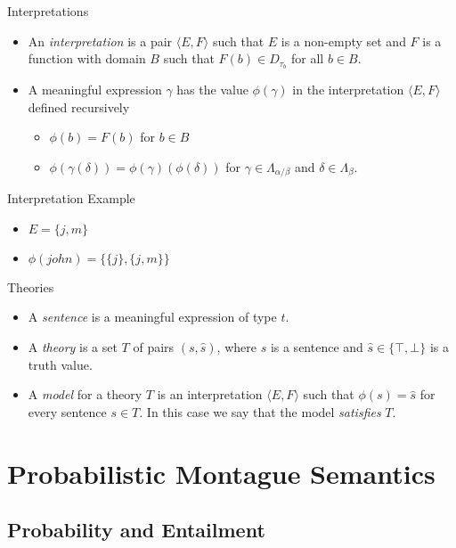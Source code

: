 \documentclass{beamer}
\newlength{\wideitemsep}
\let\olditem\item
\renewcommand{\item}{\setlength{\itemsep}{\wideitemsep}\olditem}
\begin{document}
\begin{frame}{Interpretations}
  \begin{itemize}
  \item An \emph{interpretation} is a pair $\langle E,
    F\rangle$ such that $E$ is a non-empty set and $F$ is a function with
    domain $B$ such that $F(b) \in D_{\tau_b}$ for all $b\in B$.
  \item A meaningful expression $\gamma$ has the value $\phi(\gamma)$ in the
    interpretation $\langle E, F\rangle$ defined recursively
    \begin{itemize}
    \item $\phi(b) = F(b)$ for $b\in B$
    \item $\phi(\gamma(\delta)) = \phi(\gamma)(\phi(\delta))$ for $\gamma
      \in \Lambda_{\alpha/\beta}$ and $\delta \in \Lambda_\beta$.
    \end{itemize}
  \end{itemize}
\end{frame}

\begin{frame}{Interpretation Example}
\begin{itemize}
\item $E = \{j, m\}$
\item $\phi(\mathit{john}) = \{\{j\},\{j,m\}\}$
\end{itemize}
\end{frame}

\begin{frame}{Theories}
  \begin{itemize}
  \item A \emph{sentence} is a meaningful expression of type $t$.
  \item A \emph{theory} is a set $T$ of pairs $(s,\hat{s})$, where $s$
    is a sentence and $\hat{s}\in\{\top,\bot\}$ is a truth value.
  \item A \emph{model} for a theory $T$ is an interpretation $\langle
    E, F\rangle$ such that $\phi(s) = \hat{s}$ for every sentence
    $s\in T$. In this case we say that the model \emph{satisfies} $T$.
  \end{itemize}
\end{frame}

\section{Probabilistic Montague Semantics}

\subsection{Probability and Entailment}
\end{document}
